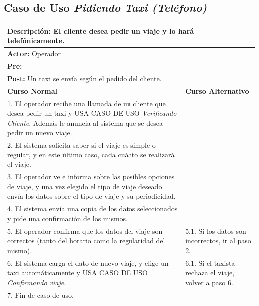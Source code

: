 \documentclass[a4paper]{article}
\begin{document}
\subsection{Caso de Uso \textit{Pidiendo Taxi (Tel\'efono)}}
\begin{center}
\begin{tabular}{|p{10cm} | p{6cm}|}
\hline
\multicolumn{2}{|p{15cm}|}{\textbf{Descripci\'on:} El cliente desea pedir un viaje y lo har\'a telef\'onicamente.} \\
\hline
\multicolumn{2}{|p{15cm}|}{\textbf{Actor:} Operador } \\
\hline
\multicolumn{2}{|p{15cm}|}{\textbf{Pre:} - } \\
\hline
\multicolumn{2}{|p{15cm}|}{\textbf{Post:} Un taxi se env\'ia seg\'un el pedido del cliente. }\\
\hline
\textbf{Curso Normal}  & \textbf{Curso Alternativo} \\ \hline
1. El operador recibe una llamada de un cliente que desea pedir un taxi y USA CASO DE USO \textit{Verificando Cliente}. Adem\'as le anuncia al sistema que se desea pedir un nuevo viaje. & \\ \hline
2. El sistema solicita saber si el viaje es simple o regular, y en este \'ultimo caso, cada cu\'anto se realizar\'a el viaje. & \\ \hline
3. El operador ve e informa sobre las posibles opciones de viaje, y una vez elegido el tipo de viaje deseado env\'ia los datos sobre el tipo de viaje y su periodicidad. & \\ \hline
4. El sistema env\'ia una copia de los datos seleccionados y pide una confirmaci\'on de los mismos. & \\ \hline
5. El operador confirma que los datos del viaje son correctos (tanto del horario como la regularidad del mismo). & 5.1. Si los datos son incorrectos, ir al paso 2. \\ \hline
6. El sistema carga el dato de nuevo viaje, y elige un taxi autom\'aticamente y USA CASO DE USO \textit{Confirmando viaje}. & 6.1. Si el taxista rechaza el viaje, volver a paso 6. \\ \hline
7. Fin de caso de uso. & \\ \hline
\end{tabular}
\end{center}
\end{document}
